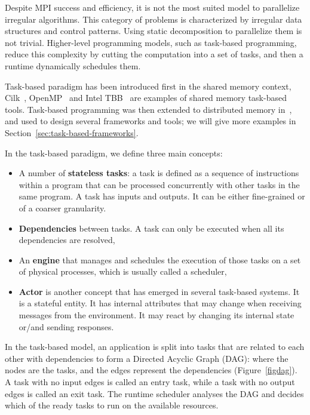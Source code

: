 Despite MPI success and efficiency, it is not the most suited model to parallelize irregular algorithms. This category of problems is characterized by irregular data structures and control patterns. Using static decomposition to parallelize them is not trivial. Higher-level programming models, such as task-based programming, reduce this complexity by cutting the computation into a set of tasks, and then a runtime dynamically schedules them. 

Task-based paradigm has been introduced first in the shared memory context, Cilk~\cite{cilk5}, OpenMP~\cite{openMP} and Intel TBB~\cite{Robison2011tbb} are examples of shared memory task-based tools. Task-based programming was then extended to distributed memory in~\cite{kooburat_extending_nodate}, and used to design several frameworks and tools; we will give more examples in Section~\ref{sec:task-based-frameworks}. 


In the task-based paradigm, we define three main concepts:
\begin{itemize}
    \item A number of \textbf{stateless tasks}: a task is defined as a sequence of instructions within a program that can be processed concurrently with other tasks in the same program\cite{thoman_taxonomy_2018}. A task has inputs and outputs. It can be either fine-grained or of a coarser granularity. 
    
    \item \textbf{Dependencies} between tasks. A task can only be executed when all its dependencies are resolved,
    
    \item An \textbf{engine} that manages and schedules the execution of those tasks on a set of physical processes, which is usually called a scheduler,

    \item \textbf{Actor} is another concept that has emerged in several task-based systems. It is a stateful entity. It has internal attributes that may change when receiving messages from the environment. It may react by changing its internal state or/and sending responses. 
\end{itemize}

In the task-based model, an application is split into tasks that are related to each other with dependencies to form a Directed Acyclic Graph (DAG): where the nodes are the tasks, and the edges represent the dependencies (Figure~\ref{figdag}). A task with no input edges is called an entry task, while a task with no output edges is called an exit task\cite{ruadulescu1999complexity}.  
The runtime scheduler analyses the DAG and decides which of the ready tasks to run on the available resources.


